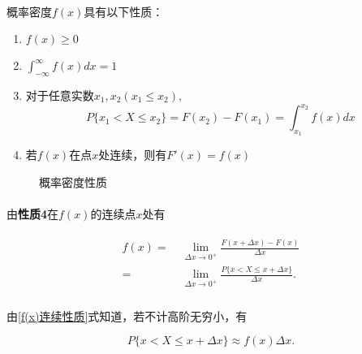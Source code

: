 \paragraph{}
概率密度$f(x)$具有以下性质：
\begin{enumerate}
  \item $f(x) \geq 0$
  \item $\int_{-\infty}^{\infty}f(x)dx=1$
  \item 对于任意实数$x_1, x_2(x_1 \leq x_2),$
  \begin{equation}
    P\{x_1 < X \leq x_2\} = F(x_2) - F(x_1) = \int_{x_1}^{x_2}f(x)dx
  \end{equation}
  \item 若$f(x)$在点$x$处连续，则有$F'(x) = f(x)$
\end{enumerate}

\begin{figure}[H]
\centering
  \begin{subfigure}[t]{0.48\linewidth}
    \centering
      
  \end{subfigure}
  \begin{subfigure}[t]{0.48\linewidth}
    \centering
      
  \end{subfigure}
  \caption{概率密度性质}
  \label{概率密度性质}
\end{figure}

\paragraph{}
由\textbf{性质4}在$f(x)$的连续点$x$处有

\begin{align}
  \label{f(x)连续性质}
  \begin{split}
    f(x) =&\; \lim_{\Delta x \to 0^+}\frac{F(x+\Delta x) - F(x)}{\Delta x} \\
    =&\; \lim_{\Delta x \to 0^+}\frac{P\{x < X \leq x + \Delta x\}}{\Delta x}.
  \end{split}
\end{align}

\paragraph{}
由\eqref{f(x)连续性质}式知道，若不计高阶无穷小，有

\begin{equation}
  P\{x < X \leq x + \Delta x\} \approx f(x)\Delta x.
\end{equation}

